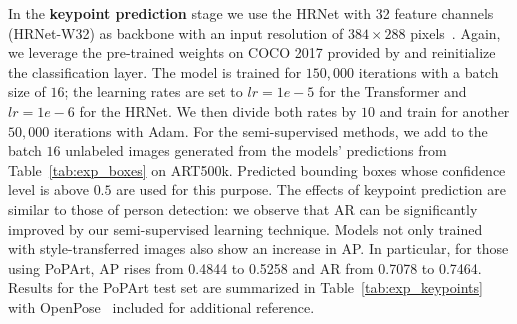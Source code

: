 \documentclass[sigconf]{acmart}
\begin{document}
\label{chp:exp_keypoint}
In the \textbf{keypoint prediction} stage we use the \acl{HRNet} with 32 feature channels (HRNet-W32) as backbone with an input resolution of $384 \times 288$ pixels~\cite{DBLP:conf/cvpr/0009XLW19}. 
Again, we leverage the pre-trained weights on COCO 2017 provided by \citet{DBLP:conf/cvpr/0012WZXXT21} and reinitialize the classification layer. 
The model is trained for $150,000$ iterations with a batch size of $16$; the learning rates are set to $lr = 1e-5$ for the Transformer and $lr = 1e-6$ for the HRNet. 
We then divide both rates by $10$ and train for another $50,000$ iterations with Adam. 
For the semi-supervised methods, we add to the batch $16$ unlabeled images generated from the models' predictions from Table~\ref{tab:exp_boxes} on ART500k. 
Predicted bounding boxes whose confidence level is above $0.5$ are used for this purpose. 
The effects of keypoint prediction are similar to those of person detection: 
we observe that \ac{AR} can be significantly improved by our semi-supervised learning technique. 
Models not only trained with style-transferred images also show an increase in \ac{AP}. 
In particular, for those using \ac{PoPArt}, \ac{AP} rises from \num{0.4844} to \num{0.5258} and \ac{AR} from \num{0.7078} to \num{0.7464}. 
Results for the \ac{PoPArt} test set are summarized in Table~\ref{tab:exp_keypoints} with OpenPose~\cite{DBLP:journals/pami/CaoHSWS21} included for additional reference.
\end{document}
